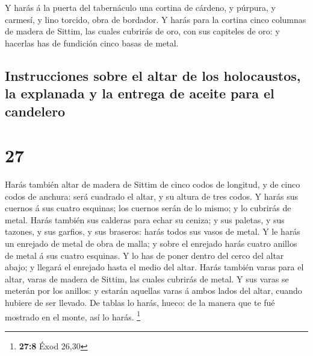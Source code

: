  Y harás á la puerta del tabernáculo una cortina de
cárdeno, y púrpura, y carmesí, y lino torcido, obra de bordador.
 Y harás para la cortina cinco columnas de madera de
Sittim, las cuales cubrirás de oro, con sus capiteles de oro: y hacerlas
has de fundición cinco basas de metal.

\hypertarget{instrucciones-sobre-el-altar-de-los-holocaustos-la-explanada-y-la-entrega-de-aceite-para-el-candelero}{%
\subsection{Instrucciones sobre el altar de los holocaustos, la
explanada y la entrega de aceite para el
candelero}\label{instrucciones-sobre-el-altar-de-los-holocaustos-la-explanada-y-la-entrega-de-aceite-para-el-candelero}}

\hypertarget{section-26}{%
\section{27}\label{section-26}}

 Harás también altar de madera de Sittim de cinco codos de
longitud, y de cinco codos de anchura: será cuadrado el altar, y su
altura de tres codos.  Y harás sus cuernos á sus cuatro
esquinas; los cuernos serán de lo mismo; y lo cubrirás de metal.
 Harás también sus calderas para echar su ceniza; y sus
paletas, y sus tazones, y sus garfios, y sus braseros: harás todos sus
vasos de metal.  Y le harás un enrejado de metal de obra
de malla; y sobre el enrejado harás cuatro anillos de metal á sus cuatro
esquinas.  Y lo has de poner dentro del cerco del altar
abajo; y llegará el enrejado hasta el medio del altar. 
Harás también varas para el altar, varas de madera de Sittim, las cuales
cubrirás de metal.  Y sus varas se meterán por los
anillos: y estarán aquellas varas á ambos lados del altar, cuando
hubiere de ser llevado.  De tablas lo harás, hueco: de la
manera que te fué mostrado en el monte, así lo harás. \footnote{\textbf{27:8}
  Éxod 26,30}


